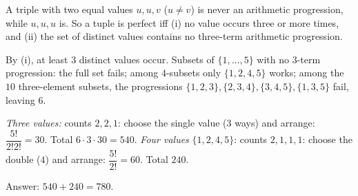 A triple with two equal values $u,u,v$ ($u\ne v$) is never an arithmetic progression, while $u,u,u$ is. So a tuple is perfect iff (i) no value occurs three or more times, and (ii) the set of distinct values contains no three-term arithmetic progression.

By (i), at least $3$ distinct values occur. Subsets of $\{1,\dots,5\}$ with no $3$-term progression: the full set fails; among $4$-subsets only $\{1,2,4,5\}$ works; among the $10$ three-element subsets, the progressions $\{1,2,3\},\{2,3,4\},\{3,4,5\},\{1,3,5\}$ fail, leaving $6$.

\emph{Three values:} counts $2,2,1$: choose the single value ($3$ ways) and arrange: $\dfrac{5!}{2!2!}=30$. Total $6\cdot3\cdot30=540$.
\emph{Four values} $\{1,2,4,5\}$: counts $2,1,1,1$: choose the double ($4$) and arrange: $\dfrac{5!}{2!}=60$. Total $240$.

Answer: $540+240=\boxed{780}$.
